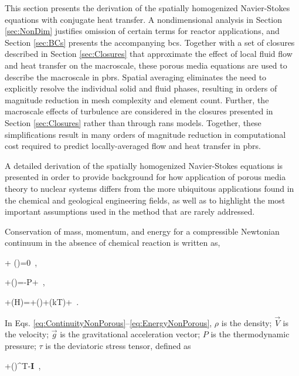 This section presents the derivation of the spatially homogenized Navier-Stokes equations with conjugate heat transfer. A nondimensional analysis in Section \ref{sec:NonDim} justifies omission of certain terms for reactor applications, and Section \ref{sec:BCs} presents the accompanying \glspl{bc}. Together with a set of closures described in Section \ref{sec:Closures} that approximate the effect of local fluid flow and heat transfer on the macroscale, these porous media equations are used to describe the macroscale in \glspl{pbr}. Spatial averaging eliminates the need to explicitly resolve the individual solid and fluid phases, resulting in orders of magnitude reduction in mesh complexity and element count. Further, the macroscale effects of turbulence are considered in the closures presented in Section \ref{sec:Closures} rather than through \gls{rans} models. Together, these simplifications result in many orders of magnitude reduction in computational cost required to predict locally-averaged flow and heat transfer in \glspl{pbr}.

A detailed derivation of the spatially homogenized Navier-Stokes equations is presented in order to provide background for how application of porous media theory to nuclear systems differs from the more ubiquitous applications found in the chemical and geological engineering fields, as well as to highlight the most important assumptions used in the method that are rarely addressed. 

Conservation of mass, momentum, and energy for a compressible Newtonian continuum in the absence of chemical reaction is written as,

\beq
\label{eq:ContinuityNonPorous}
 + \nabla\cdot(\rho{})=0\ ,
\eeq

\beq
\label{eq:NSFullForm}
+\nabla\cdot(\rho{})=\rho{}-\nabla P+\nabla\cdot\tau\ ,
\eeq

\beq
\label{eq:EnergyNonPorous}
+\nabla\cdot(\rho H)=\rho {}\cdot{}+\nabla\cdot(\tau)+\nabla\cdot(k\nabla T)+\ .
\eeq

\noindent In Eqs. \eqref{eq:ContinuityNonPorous}--\eqref{eq:EnergyNonPorous}, \(\rho\) is the density; \(\vec{V}\) is the velocity; \(\vec{g}\) is the gravitational acceleration vector; \(P\) is the thermodynamic pressure; \(\tau\) is the deviatoric stress tensor, defined as

\beq
\label{eq:TauDef}
\tau\equiv\mu\left\lbrack\nabla {}+(\nabla {})^T\right\rbrack-\nabla\cdot{}\textbf{I}\ ,
\eeq

